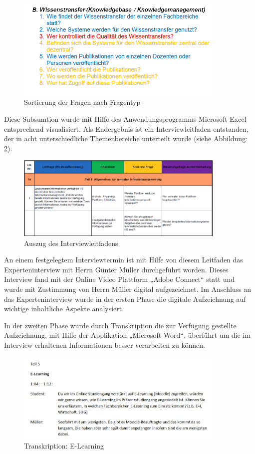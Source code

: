 \begin{figure}[h!]
	\centering
	\includegraphics[width=10cm]{kapitel/gruppe2/bilder/sortierung_fragentyp}
	\caption{Sortierung der Fragen nach Fragentyp}
	\label{fig_sortierung_fragentyp}
\end{figure}

Diese Subsumtion wurde mit Hilfe des Anwendungsprogramms Microsoft Excel entsprechend visualisiert. Als Endergebnis  ist ein Interviewleitfaden entstanden, der in acht unterschiedliche Themenbereiche unterteilt wurde  (siehe Abbildung: \ref{fig_auszug_interviewleitfaden}).

\begin{figure}[h!]
	\centering
	\includegraphics[width=10cm]{kapitel/gruppe2/bilder/auszug_leitfaden}
	\caption{Auszug des Interviewleitfadens}
	\label{fig_auszug_interviewleitfaden}
\end{figure}

An einem festgelegtem Interviewtermin ist mit Hilfe von diesem Leitfaden das Experteninterview mit Herrn Günter Müller durchgeführt worden. Dieses Interview fand mit der Online Video Plattform „Adobe Connect“ statt und wurde mit Zustimmung von Herrn Müller digital aufgezeichnet. Im Anschluss an das Experteninterview wurde in der ersten Phase die digitale Aufzeichnung auf wichtige inhaltliche Aspekte analysiert. 

In der zweiten Phase wurde durch Transkription die zur Verfügung gestellte Aufzeichnung, mit Hilfe der Applikation „Microsoft Word“, überführt um die im Interview erhaltenen Informationen besser verarbeiten zu können.

\begin{figure}[h!]
	\centering
	\includegraphics[width=10cm]{kapitel/gruppe2/bilder/E-Learning_Transkription}
	\caption{Transkription: E-Learning}
	\label{fig_E-Learning_Transkription}
\end{figure}

